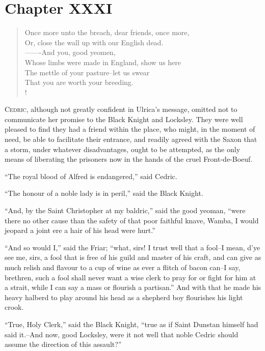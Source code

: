 \chapter{Chapter XXXI}

\begin{verse}
Once more unto the breach, dear friends, once more,\\
Or, close the wall up with our English dead.\\
-------And you, good yeomen,\\
Whose limbs were made in England, show us here\\
The mettle of your pasture--let us swear\\
That you are worth your breeding.\\!
\end{verse}

\lettrine{C}{edric}, although not greatly confident in Ulrica's message,
omitted not
to communicate her promise to the Black Knight and Locksley. They were
well pleased to find they had a friend within the place, who might, in
the moment of need, be able to facilitate their entrance, and readily
agreed with the Saxon that a storm, under whatever disadvantages, ought
to be attempted, as the only means of liberating the prisoners now in
the hands of the cruel Front-de-Boeuf.

``The royal blood of Alfred is endangered,'' said Cedric.

``The honour of a noble lady is in peril,'' said the Black Knight.

``And, by the Saint Christopher at my baldric,'' said the good yeoman,
``were there no other cause than the safety of that poor faithful knave,
Wamba, I would jeopard a joint ere a hair of his head were hurt.''

``And so would I,'' said the Friar; ``what, sirs! I trust well that a
fool--I mean, d'ye see me, sirs, a fool that is free of his guild and
master of his craft, and can give as much relish and flavour to a cup of
wine as ever a flitch of bacon can--I say, brethren, such a fool shall
never want a wise clerk to pray for or fight for him at a strait, while
I can say a mass or flourish a partisan.'' And with that he made his
heavy halberd to play around his head as a shepherd boy flourishes his
light crook.

``True, Holy Clerk,'' said the Black Knight, ``true as if Saint Dunstan
himself had said it.--And now, good Locksley, were it not well that
noble Cedric should assume the direction of this assault?''

